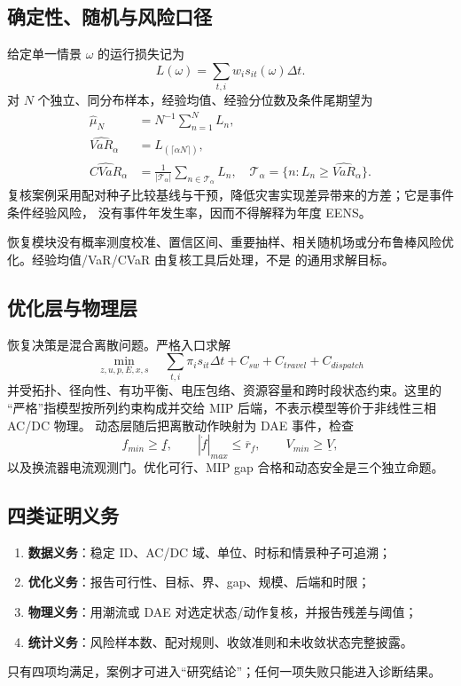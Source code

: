 \subsection{确定性、随机与风险口径}
给定单一情景 $\omega$ 的运行损失记为
\begin{equation}
 L(\omega)=\sum_{t,i}w_i s_{it}(\omega)\Delta t.
\end{equation}
对 $N$ 个独立、同分布样本，经验均值、经验分位数及条件尾期望为
\begin{align}
 \widehat\mu_N&=N^{-1}\sum_{n=1}^{N}L_n,\\
 \widehat{VaR}_{\alpha}&=L_{(\lceil\alpha N\rceil)},\\
 \widehat{CVaR}_{\alpha}&=\frac{1}{|\mathcal T_\alpha|}
   \sum_{n\in\mathcal T_\alpha}L_n,
 \quad \mathcal T_\alpha=\{n:L_n\ge\widehat{VaR}_\alpha\}.
\end{align}
复核案例采用配对种子比较基线与干预，降低灾害实现差异带来的方差；它是事件条件经验风险，
没有事件年发生率，因而不得解释为年度 EENS。

\begin{gapnote}
恢复模块没有概率测度校准、置信区间、重要抽样、相关随机场或分布鲁棒风险优化。经验均值/VaR/CVaR
由复核工具后处理，不是  的通用求解目标。
\end{gapnote}

\subsection{优化层与物理层}
恢复决策是混合离散问题。严格入口求解
\begin{equation}
 \min_{z,u,p,E,x,s}\quad
 \sum_{t,i}\pi_i s_{it}\Delta t+C_{sw}+C_{travel}+C_{dispatch}
\end{equation}
并受拓扑、径向性、有功平衡、电压包络、资源容量和跨时段状态约束。这里的
``严格''指模型按所列约束构成并交给 MIP 后端，不表示模型等价于非线性三相 AC/DC 物理。
动态层随后把离散动作映射为 DAE 事件，检查
\begin{equation}
 f_{min}\ge\underline f,\qquad
 |\dot f|_{max}\le\overline r_f,\qquad
 V_{min}\ge\underline V,
\end{equation}
以及换流器电流观测门。优化可行、MIP gap 合格和动态安全是三个独立命题。

\subsection{四类证明义务}
\begin{enumerate}
 \item \textbf{数据义务}：稳定 ID、AC/DC 域、单位、时标和情景种子可追溯；
 \item \textbf{优化义务}：报告可行性、目标、界、gap、规模、后端和时限；
 \item \textbf{物理义务}：用潮流或 DAE 对选定状态/动作复核，并报告残差与阈值；
 \item \textbf{统计义务}：风险样本数、配对规则、收敛准则和未收敛状态完整披露。
\end{enumerate}
只有四项均满足，案例才可进入“研究结论”；任何一项失败只能进入诊断结果。

